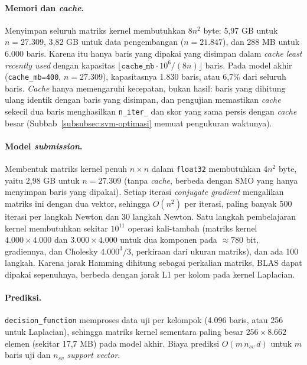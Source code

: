\paragraph{Memori dan \textit{cache}.} Menyimpan seluruh matriks kernel membutuhkan $8n^2$ byte: 5,97 GB untuk $n = 27.309$, 3,82 GB untuk data pengembangan ($n = 21.847$), dan 288 MB untuk 6.000 baris. Karena itu hanya baris yang dipakai yang disimpan dalam \textit{cache} \textit{least recently used} dengan kapasitas $\lfloor \texttt{cache\_mb}\cdot 10^6 / (8n)\rfloor$ baris. Pada model akhir (\texttt{cache\_mb=400}, $n = 27.309$), kapasitasnya 1.830 baris, atau 6,7\% dari seluruh baris. \textit{Cache} hanya memengaruhi kecepatan, bukan hasil: baris yang dihitung ulang identik dengan baris yang disimpan, dan pengujian memastikan \textit{cache} sekecil dua baris menghasilkan \texttt{n\_iter\_} dan skor yang sama persis dengan \textit{cache} besar (Subbab~\ref{subsubsec:svm-optimasi} memuat pengukuran waktunya).

\paragraph{Model \textit{submission}.} Membentuk matriks kernel penuh $n \times n$ dalam \texttt{float32} membutuhkan $4n^2$ byte, yaitu 2,98 GB untuk $n = 27.309$ (tanpa \textit{cache}, berbeda dengan SMO yang hanya menyimpan baris yang dipakai). Setiap iterasi \textit{conjugate gradient} mengalikan matriks ini dengan dua vektor, sehingga $O(n^2)$ per iterasi, paling banyak 500 iterasi per langkah Newton dan 30 langkah Newton. Satu langkah pembelajaran kernel membutuhkan sekitar $10^{11}$ operasi kali-tambah (matriks kernel $4.000 \times 4.000$ dan $3.000 \times 4.000$ untuk dua komponen pada $\approx 780$ bit, gradiennya, dan Cholesky $4.000^3/3$, perkiraan dari ukuran matriks), dan ada 100 langkah. Karena jarak Hamming dihitung sebagai perkalian matriks, BLAS dapat dipakai sepenuhnya, berbeda dengan jarak L1 per kolom pada kernel Laplacian.

\paragraph{Prediksi.} \texttt{decision\_function} memproses data uji per kelompok (4.096 baris, atau 256 untuk Laplacian), sehingga matriks kernel sementara paling besar $256 \times 8.662$ elemen (sekitar 17,7 MB) pada model akhir. Biaya prediksi $O(m\,n_{sv}\,d)$ untuk $m$ baris uji dan $n_{sv}$ \textit{support vector}.

